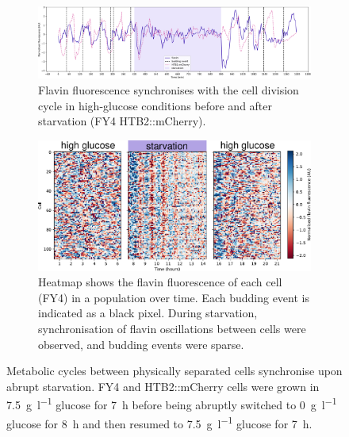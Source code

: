\begin{figure}
  \centering
  \begin{subfigure}[htpb]{1.0\textwidth}
   \centering
   \includegraphics[width=\textwidth]{starvation_single_birth_plot_new_edit.pdf}
   \caption{
     Flavin fluorescence synchronises with the cell division cycle in high-glucose conditions before and after starvation (FY4 HTB2::mCherry).
   }
   \label{fig:biology-starvation-single}
  \end{subfigure}

  \begin{subfigure}[htpb]{0.7\textwidth}
   \centering
   \includegraphics[width=\textwidth]{heatmap_012_edit.pdf}
   \caption{
     Heatmap shows the flavin fluorescence of each cell (FY4) in a population over time.
     Each budding event is indicated as a black pixel.
     During starvation, synchronisation of flavin oscillations between cells were observed, and budding events were sparse.
   }
   \label{fig:biology-starvation-heatmap}
  \end{subfigure}

  \caption{
     Metabolic cycles between physically separated cells synchronise upon abrupt starvation.
     FY4 and HTB2::mCherry cells were grown in \SI{7.5}{\gram~\litre^{-1}} glucose for \SI{7}{\hour} before being abruptly switched to \SI{0}{\gram~\litre^{-1}} glucose for \SI{8}{\hour} and then resumed to \SI{7.5}{\gram~\litre^{-1}} glucose for \SI{7}{\hour}.
  }
  \label{fig:biology-starvation}
\end{figure}


